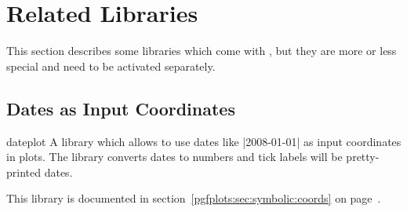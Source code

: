 \section{Related Libraries}
This section describes some libraries which come with \PGFPlots, but they are more or less special and need to be activated separately.

\subsection{Dates as Input Coordinates}
\begin{tikzlibrary}{dateplot}
	A library which allows to use dates like |2008-01-01| as input coordinates in plots. The library converts dates to numbers and tick labels will be pretty-printed dates.

	This library is documented in section~\ref{pgfplots:sec:symbolic:coords} on page~\pageref{pgfplots:sec:date:coords}.
\end{tikzlibrary}

